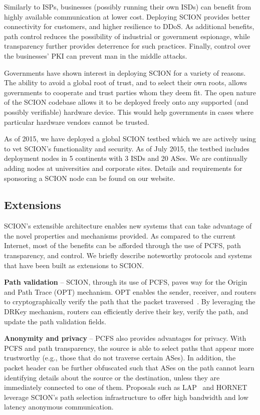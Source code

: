 \documentclass[a4paper]{llncs}
\newcommand\SCION{{\small\textsf{SCION}}\xspace}
\begin{document}
Similarly to ISPs, businesses (possibly running their own ISDs) can benefit
from highly available communication at lower cost. Deploying \SCION provides better
connectivity for customers, and higher resilience to DDoS. As additional
benefits, path control reduces the possibility of industrial or government
espionage, while transparency further provides deterrence for such practices.
Finally, control over the businesses' PKI can prevent man in the middle
attacks. 

Governments have shown interest in deploying \SCION for a variety of reasons.
The ability to avoid a global root of trust, and to select their own roots,
allows governments to cooperate and trust parties whom they deem fit. The open
nature of the \SCION codebase allows it to be deployed freely onto any supported
(and possibly verifiable) hardware device. This would help governments in cases where
particular hardware vendors cannot be trusted.

As of 2015, we have deployed a global \SCION testbed which we are actively
using to vet \SCION's functionality and security. As of July 2015, the testbed includes
deployment nodes in 5 continents with 3 ISDs and 20 ASes. We are continually
adding nodes at universities and corporate sites. Details and
requirements for sponsoring a \SCION node can be found on our website.







\subsection{Extensions}

\SCION{}'s extensible architecture enables new systems that can take advantage
of the novel properties and mechanisms provided. As compared to the current
Internet, most of the benefits can be afforded through the use of PCFS, path
transparency, and control. We briefly describe noteworthy protocols and systems
that have been built as extensions to \SCION.

\textbf{Path validation} -- \SCION, through its use of PCFS, paves way for the
Origin and Path Trace (OPT) mechanism. OPT enables the sender,
receiver, and routers to cryptographically verify the path that the packet
traversed~\cite{KBJLHP2014}. By leveraging the DRKey mechanism, routers can
efficiently derive their key, verify the path, and update the path validation
fields.

\textbf{Anonymity and privacy} -- PCFS also
provides advantages for privacy.  With PCFS and path transparency, the source
is able to select paths that appear more trustworthy (e.g., those that do not
traverse certain ASes).  In addition, the packet header can be further
obfuscated such that ASes on the path cannot learn identifying details about
the source or the destination, unless they are immediately connected to one of
them. Proposals such as LAP~\cite{HKPYNGM2012} and HORNET~\cite{CABDP2015}
leverage \SCION's path selection infrastructure to offer high bandwidth and low
latency anonymous communication. 
\end{document}

